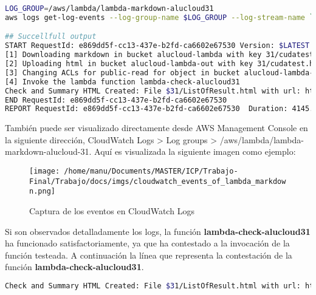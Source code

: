 \documentclass[
]{article}
\begin{document}
\begin{lstlisting}[language=bash,caption={Listar logs generados}]
LOG_GROUP=/aws/lambda/lambda-markdown-alucloud31
aws logs get-log-events --log-group-name $LOG_GROUP --log-stream-name `aws logs describe-log-streams --log-group-name $LOG_GROUP --max-items 1 --order-by LastEventTime --descending --query logStreams[].logStreamName --output text | head -n 1` --query events[].message --output text

## Succellfull output
START RequestId: e869dd5f-cc13-437e-b2fd-ca6602e67530 Version: $LATEST
[1] Downloading markdown in bucket alucloud-lambda with key 31/cudatest.md
[2] Uploading html in bucket alucloud-lambda-out with key 31/cudatest.html
[3] Changing ACLs for public-read for object in bucket alucloud-lambda-out with key 31/cudatest.html
[4] Invoke the lambda function lambda-check-alucloud31
Check and Summary HTML Created: File $31/ListOfResult.html with url: https://alucloud-lambda-out.s3.amazonaws.com/31/ListOfResult.html
END RequestId: e869dd5f-cc13-437e-b2fd-ca6602e67530
REPORT RequestId: e869dd5f-cc13-437e-b2fd-ca6602e67530	Duration: 4145.55 ms	Billed Duration: 4146 ms	Memory Size: 128 MB	Max Memory Used: 84 MB	Init Duration: 509.80 ms
\end{lstlisting}

También puede ser visualizado directamente desde AWS Management Console
en la siguiente dirección, CloudWatch Logs \textgreater{} Log groups
\textgreater{} /aws/lambda/lambda-markdown-alucloud-31. Aquí es
visualizada la siguiente imagen como ejemplo:

\begin{figure}[H]
\centering
\texttt{[image: /home/manu/Documents/MASTER/ICP/Trabajo-Final/Trabajo/docs/imgs/cloudwatch\_events\_of\_lambda\_markdown.png]}
\caption{Captura de los eventos en CloudWatch Logs}
\end{figure}

Si son observados detalladamente los logs, la función
\textbf{lambda-check-alucloud31} ha funcionado satisfactoriamente, ya
que ha contestado a la invocación de la función testeada. A continuación
la línea que representa la contestación de la función
\textbf{lambda-check-alucloud31}.

\begin{lstlisting}[language=bash,caption={Respuesta}]
Check and Summary HTML Created: File $31/ListOfResult.html with url: https://alucloud-lambda-out.s3.amazonaws.com/31/ListOfResult.html
\end{lstlisting}
\end{document}

